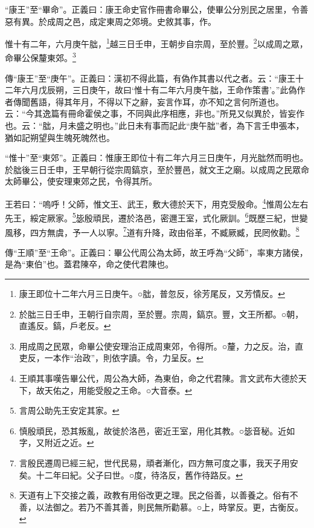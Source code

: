 {\noindent\shu{}\fzkt “康王”至“畢命”。正義曰：康王命史官作冊書命畢公，使畢公分別民之居里，令善惡有異。於成周之邑，成定東周之郊境。史敘其事，作。 \par}

惟十有二年，六月庚午朏，\footnote{康王即位十二年六月三日庚午。○朏，普忽反，徐芳尾反，又芳憒反。}越三日壬申，王朝步自宗周，至於豐。\footnote{於朏三日壬申，王朝行自宗周，至於豐。宗周，鎬京。豐，文王所都。○朝，直遙反。鎬，戶老反。}以成周之眾，命畢公保釐東郊。\footnote{用成周之民眾，命畢公使安理治正成周東郊，令得所。○釐，力之反。治，直吏反，一本作“治政”，則依字讀。令，力呈反。}


{\noindent\zhuan{}\fzbyks 傳“康王”至“庚午”。正義曰：漢初不得此篇，有偽作其書以代之者。云：“康王十二年六月戊辰朔，三日庚午，故曰‘惟十有二年六月庚午朏，王命作策書’。”此偽作者傳聞舊語，得其年月，不得以下之辭，妄言作耳，亦不知之言何所道也。云：“今其逸篇有冊命霍侯之事，不同與此序相應，非也。”所見又似異於，皆妄作也。云：“朏，月未盛之明也。”此日未有事而記此“庚午朏”者，為下言壬申張本，猶如記朔望與生魄死魄然也。 \par}

{\noindent\shu{}\fzkt “惟十”至“東郊”。正義曰：惟康王即位十有二年六月三日庚午，月光朏然而明也。於朏後三日壬申，王早朝行從宗周鎬京，至於豐邑，就文王之廟。以成周之民眾命太師畢公，使安理東郊之民，令得其所。 \par}

王若曰：“嗚呼！父師，惟文王、武王，敷大德於天下，用克受殷命。\footnote{王順其事嘆告畢公代，周公為大師，為東伯，命之代君陳。言文武布大德於天下，故天佑之，用能受殷之王命。○大音泰。}惟周公左右先王，綏定厥家。\footnote{言周公助先王安定其家。}毖殷頑民，遷於洛邑，密邇王室，式化厥訓。\footnote{慎殷頑民，恐其叛亂，故徙於洛邑，密近王室，用化其教。○毖音秘。近如字，又附近之近。}既歷三紀，世變風移，四方無虞，予一人以寧。\footnote{言殷民遷周已經三紀，世代民易，頑者漸化，四方無可度之事，我天子用安矣。十二年曰紀。父子曰世。○度，待洛反，舊作待路反。}道有升降，政由俗革，不臧厥臧，民罔攸勸。\footnote{天道有上下交接之義，政教有用俗改更之理。民之俗善，以善養之。俗有不善，以法御之。若乃不善其善，則民無所勸慕。○上，時掌反。更，古衡反。}


{\noindent\zhuan{}\fzbyks 傳“王順”至“王命”。正義曰：畢公代周公為太師，故王呼為“父師”，率東方諸侯，是為“東伯”也。蓋君陳卒，命之使代君陳也。 \par}

